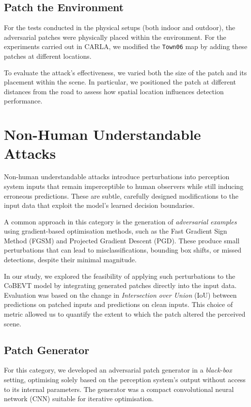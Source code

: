 \subsection{Patch the Environment}

For the tests conducted in the physical setups (both indoor and outdoor), the adversarial patches were physically placed within the environment.
For the experiments carried out in CARLA, we modified the \texttt{Town06} map by adding these patches at different locations.

To evaluate the attack’s effectiveness, we varied both the size of the patch and its placement within the scene.
In particular, we positioned the patch at different distances from the road to assess how spatial location influences detection performance.

\section{Non-Human Understandable Attacks}

Non-human understandable attacks introduce perturbations into perception system inputs that remain imperceptible to human observers while still inducing erroneous predictions.
These are subtle, carefully designed modifications to the input data that exploit the model’s learned decision boundaries.

A common approach in this category is the generation of \textit{adversarial examples} using gradient-based optimisation methods, such as the Fast Gradient Sign Method (FGSM) and Projected Gradient Descent (PGD).
These produce small perturbations that can lead to misclassifications, bounding box shifts, or missed detections, despite their minimal magnitude.

In our study, we explored the feasibility of applying such perturbations to the CoBEVT model by integrating generated patches directly into the input data.
Evaluation was based on the change in \textit{Intersection over Union} (IoU) between predictions on patched inputs and predictions on clean inputs.
This choice of metric allowed us to quantify the extent to which the patch altered the perceived scene.

\subsection{Patch Generator}

For this category, we developed an adversarial patch generator in a \textit{black-box} setting, optimising solely based on the perception system’s output without access to its internal parameters.
The generator was a compact convolutional neural network (CNN) suitable for iterative optimisation.


